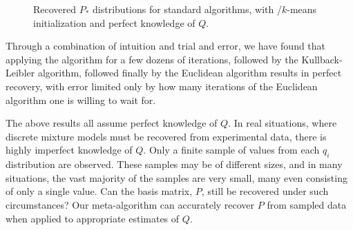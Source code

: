 \documentclass[conference]{IEEEtran}
\begin{document}
\begin{figure}[t]
\begin{center}
\end{center}
\caption{Recovered $P_*$ distributions for standard  algorithms, with /$k$-means initialization and perfect knowledge of $Q$.}
\end{figure}


Through a combination of intuition and trial and error, we have found that applying the  algorithm for a few dozens of iterations, followed by the Kullback-Leibler algorithm, followed finally by the Euclidean algorithm results in perfect recovery, with error limited only by how many iterations of the Euclidean algorithm one is willing to wait for.

The above results all assume perfect knowledge of $Q$.
In real situations, where discrete mixture models must be recovered from experimental data, there is highly imperfect knowledge of $Q$.
Only a finite sample of values from each $q_i$ distribution are observed.
These samples may be of different sizes, and in many situations, the vast majority of the samples are very small, many even consisting of only a single value.
Can the basis matrix, $P$, still be recovered under such circumstances?
Our meta-algorithm can accurately recover $P$ from sampled data when applied to appropriate estimates of $Q$.
\end{document}
